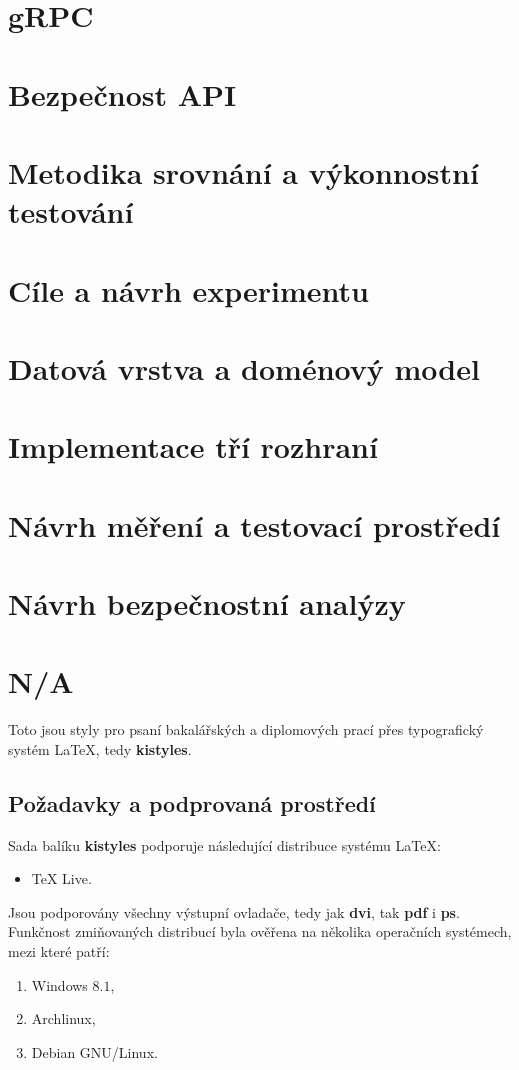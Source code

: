 \documentclass[
  program=itk,
  biblatex,
  language=czech,
  figures=false,
  glossaries,
  index
]{kidiplom}
\begin{document}
\section{gRPC}
\section{Bezpečnost API}
\section{Metodika srovnání a výkonnostní testování}
\section{Cíle a návrh experimentu}
\section{Datová vrstva a doménový model}
\section{Implementace tří rozhraní}
\section{Návrh měření a testovací prostředí}
\section{Návrh bezpečnostní analýzy}
\section{N/A}
Toto jsou styly pro psaní bakalářských a diplomových prací přes typografický systém \LaTeX{}, tedy \textbf{kistyles}.

\subsection{Požadavky a podprovaná prostředí}
Sada balíku \textbf{kistyles} podporuje následující distribuce systému \LaTeX{}:
\begin{itemize}
\item \TeX{} Live.
\end{itemize}

Jsou podporovány všechny výstupní ovladače, tedy jak \textbf{dvi}, tak \textbf{pdf} i \textbf{ps}. Funkčnost zmiňovaných distribucí byla ověřena na několika operačních systémech, mezi které patří:
\begin{enumerate}
\item Windows $8.1$,
\item Archlinux,
\item Debian GNU/Linux.
\end{enumerate}
\end{document}
